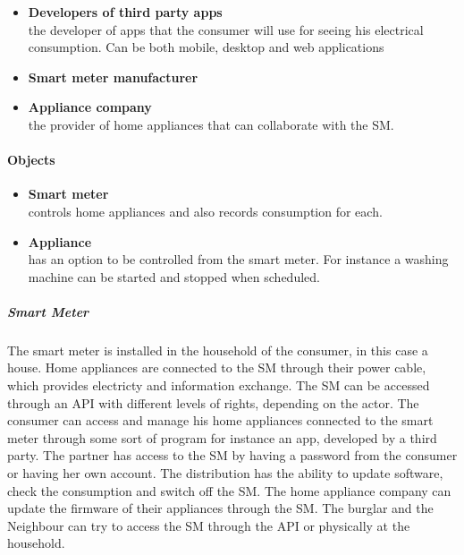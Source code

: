 \begin{itemize}
\item \textbf{Developers of third party apps}\\
the developer of apps that the consumer will use for seeing his electrical consumption. Can be both mobile, desktop and web applications
\item \textbf{Smart meter manufacturer}\\
\item \textbf{Appliance company}\\ the provider of home appliances that can collaborate with the SM.
\end{itemize}

\paragraph{Objects}
\begin{itemize}
\item \textbf{Smart meter}\\ controls home appliances and also records consumption for each.
\item \textbf{Appliance}\\ has an option to be controlled from the smart meter. For instance a washing machine can be started and stopped when scheduled.
\end{itemize}

\subparagraph{Smart Meter}
The smart meter is installed in the household of the consumer, in this case a house.
Home appliances are connected to the SM through their power cable, which provides electricty and information exchange.
The SM can be accessed through an API with different levels of rights, depending on the actor.
The consumer can access and manage his home appliances connected to the smart meter through some sort of program for instance an app, developed by a third party.
The partner has access to the SM by having a password from the consumer or having her own account.
The distribution has the ability to update software, check the consumption and switch off the SM.
The home appliance company can update the firmware of their appliances through the SM.
The burglar and the Neighbour can try to access the SM through the API or physically at the household.
